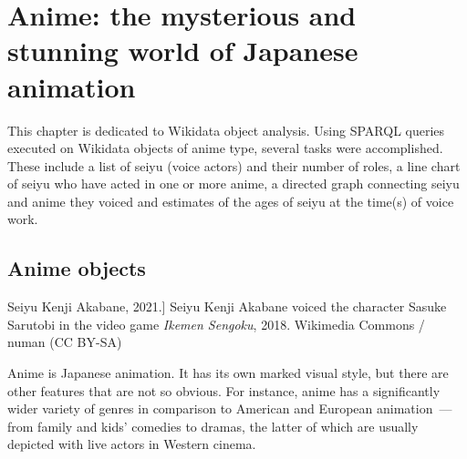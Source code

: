 
\chapter[Anime: the mysterious and stunning world of Japanese animation]{Anime: the mysterious and stunning world of Japanese animation\protect\footnotemark}




This chapter is dedicated to  Wikidata object analysis. Using SPARQL queries executed on Wikidata objects of anime type, several tasks were accomplished. These include a list of seiyu (voice actors) and their number of roles, a line chart of seiyu who have acted in one or more anime, a directed graph connecting seiyu and anime they voiced and estimates of the ages of seiyu at the time(s) of voice work.

\section{Anime objects}

\begin{marginfigure}[0.0cm]
{
	\setlength{\fboxsep}{0pt}%
	\setlength{\fboxrule}{1pt}%
}
\caption
[Seiyu Kenji Akabane, 2021.]
{%
Seiyu Kenji Akabane voiced the character Sasuke Sarutobi in the video game \emph{Ikemen Sengoku}, 2018.\newline
Wikimedia Commons / numan (CC BY-SA)
}
\label{fig:seiyu}
\end{marginfigure}

Anime is Japanese animation. It has its own marked visual style, but there are other features that are not so obvious. For instance, anime has a significantly wider variety of genres in comparison to American and European animation~--- from family and kids' comedies to dramas, the latter of which are usually depicted with live actors in Western cinema.

